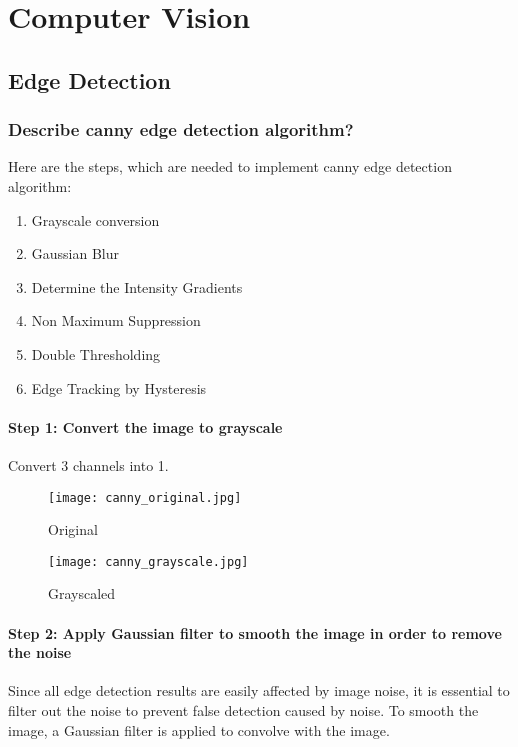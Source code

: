 \chapter{   Computer Vision}

\graphicspath{{./images/computer_vision/}}

\section{Edge Detection}

\subsection{Describe canny edge detection algorithm?}
Here are the steps, which are needed to implement canny edge detection algorithm:
\begin{enumerate}
    \item Grayscale conversion
    \item Gaussian Blur
    \item Determine the Intensity Gradients
    \item Non Maximum Suppression
    \item Double Thresholding
    \item Edge Tracking by Hysteresis
\end{enumerate}

\subsubsection{Step 1: Convert the image to grayscale}
Convert 3 channels into 1.

\begin{figure}[!htb]
    \centering
    \begin{minipage}{.5\textwidth}
        \centering
        \texttt{[image: canny\_original.jpg]}
        \caption{Original}
    \end{minipage}%
    \begin{minipage}{.5\textwidth}
        \centering
        \texttt{[image: canny\_grayscale.jpg]}
        \caption{Grayscaled}
    \end{minipage}
\end{figure}


\subsubsection{Step 2: Apply Gaussian filter to smooth the image in order to remove the noise}
Since all edge detection results are easily affected by image noise, it is essential to filter out the noise to prevent false detection caused by noise. To smooth the image, a Gaussian filter is applied to convolve with the image.

